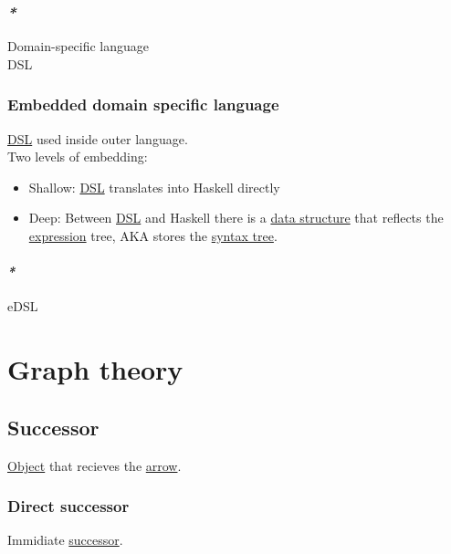 \documentclass[a4paper,14pt,oneside]{book}
\begin{document}
\subsection{\emph{*}}
\label{sec:org2ee7ad9}

\label{org7041d47}Domain-specific language\\
\label{org8e90b6c}DSL\\

\subsection{\label{org7f91a9e}Embedded domain specific language}
\label{sec:orge2deca2}

\hyperref[org8e90b6c]{DSL} used inside outer language.\\

Two levels of embedding:\\

\begin{itemize}
\item Shallow: \hyperref[org8e90b6c]{DSL} translates into Haskell directly\\
\item Deep: Between \hyperref[org8e90b6c]{DSL} and Haskell there is a \hyperref[org7ccfca9]{data structure} that reflects the \hyperref[orgc25ca10]{expression} tree, AKA stores the \hyperref[orgf611c7a]{syntax tree}.\\
\end{itemize}

\subsubsection{\emph{*}}
\label{sec:org7cad5e4}

\label{org6406327}eDSL\\

\chapter{\label{org5ca31c1}Graph theory}
\label{sec:orgbccc10f}
\section{\label{org6e8899b}Successor}
\label{sec:org65f9b48}
\hyperref[orgf695f6d]{Object} that recieves the \hyperref[orga07bb6a]{arrow}.\\

\subsection{\label{orga417a23}Direct successor}
\label{sec:orgbb7aa81}
Immidiate \hyperref[org6e8899b]{successor}.\\
\end{document}

